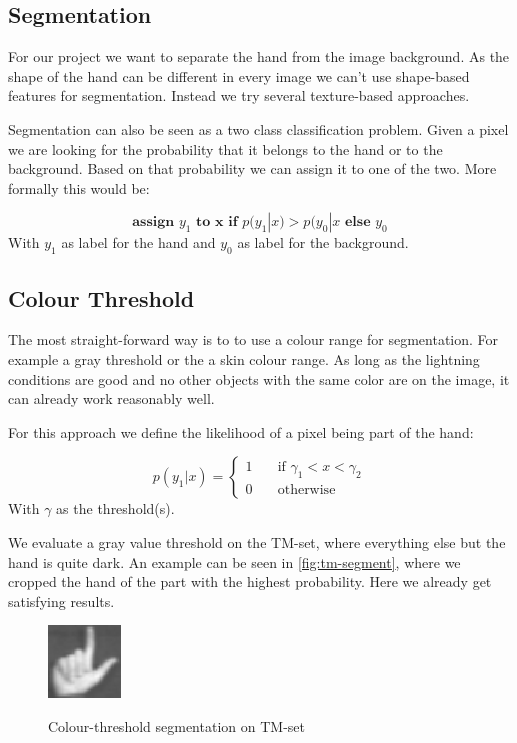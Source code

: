 \documentclass[letterpaper, 10 pt, conference]{ieeeconf}  %
\begin{document}
\subsection{Segmentation}

For our project we want to separate the hand from the image background. As the shape of the hand can be different in every image we can't use shape-based features for segmentation. Instead we try several texture-based approaches.

Segmentation can also be seen as a two class classification problem. Given a pixel we are looking for the probability that it belongs to the hand or to the background. Based on that probability we can assign it to one of the two. More formally this would be:

\begin{equation}
	\textbf{assign } y_1 \textbf{ to x if } p(y_1|x) > p(y_0|x \textbf{ else } y_0
\end{equation}
With $y_1$ as label for the hand and $y_0$ as label for the background. 

\subsection{Colour Threshold}

The most straight-forward way is to to use a colour range for segmentation. For example a gray threshold or the a skin colour range. As long as the lightning conditions are good and no other objects with the same color are on the image, it can already work reasonably well. 

For this approach we define the likelihood of a pixel being part of the hand:

\begin{equation}
p(y_1 | x) = \begin{cases}
1 & \quad \text{if } \gamma_1 < x < \gamma_2 \\
0 & \quad \text{otherwise}
\end{cases}
\end{equation}
With $\gamma$ as the threshold(s).

We evaluate a gray value threshold on the TM-set, where everything else but the hand is quite dark. An example can be seen in \autoref{fig:tm-segment}, where we cropped the hand of the part with the highest probability. Here we already get satisfying results.

\begin{figure}
\centering
\includegraphics[width=0.4\linewidth]{tm-segment}
\label{fig:tm-segment}
\caption{Colour-threshold segmentation on TM-set}
\end{figure}
\end{document}
